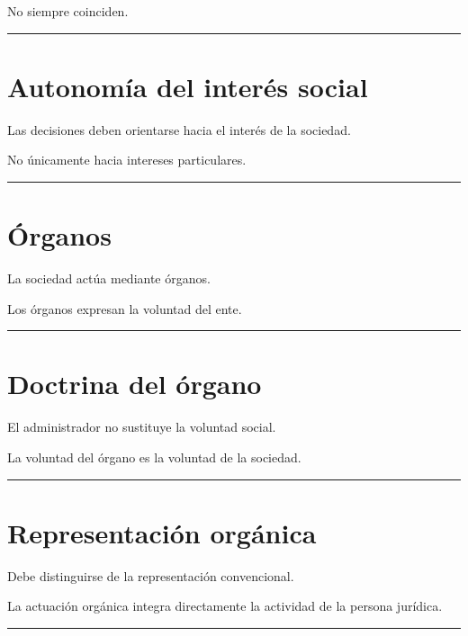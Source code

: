 \documentclass[
  spanish,
  letterpaper,
  DIV=11,
  numbers=noendperiod]{scrartcl}
\begin{document}
No siempre coinciden.

\begin{center}\rule{0.5\linewidth}{0.5pt}\end{center}

\section{Autonomía del interés
social}\label{autonomuxeda-del-interuxe9s-social}

Las decisiones deben orientarse hacia el interés de la sociedad.

No únicamente hacia intereses particulares.

\begin{center}\rule{0.5\linewidth}{0.5pt}\end{center}

\section{Órganos}\label{uxf3rganos}

La sociedad actúa mediante órganos.

Los órganos expresan la voluntad del ente.

\begin{center}\rule{0.5\linewidth}{0.5pt}\end{center}

\section{Doctrina del órgano}\label{doctrina-del-uxf3rgano}

El administrador no sustituye la voluntad social.

La voluntad del órgano es la voluntad de la sociedad.

\begin{center}\rule{0.5\linewidth}{0.5pt}\end{center}

\section{Representación orgánica}\label{representaciuxf3n-orguxe1nica}

Debe distinguirse de la representación convencional.

La actuación orgánica integra directamente la actividad de la persona
jurídica.

\begin{center}\rule{0.5\linewidth}{0.5pt}\end{center}
\end{document}
